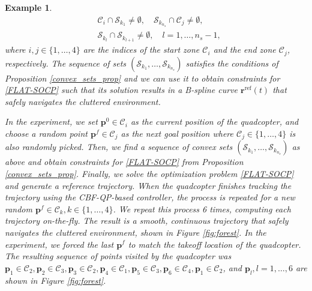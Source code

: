 \documentclass[journal,10pt]{IEEEtran}
\newtheorem{example}{\bfseries Example}%
\newcommand{\vect}[1]{\boldsymbol{\mathbf{#1}}}
\begin{document}
\begin{example}
\begin{align*}
    &\mathcal{C}_i \cap \mathcal{S}_{k_1} \neq \emptyset, \quad \mathcal{S}_{k_{n_s}}\cap\mathcal{C}_j\neq \emptyset,\\
    &\mathcal{S}_{k_l}\cap \mathcal{S}_{k_{l+1}}\neq \emptyset , \quad l = 1,\ldots,n_s-1,
\end{align*}
where $i,j\in\{1,\ldots,4\}$ are the indices of the start zone $\mathcal{C}_i$ and the end zone $\mathcal{C}_j$, respectively. The sequence of sets $(\mathcal{S}_{k_1},\ldots,\mathcal{S}_{k_{n_s}})$ satisfies the conditions of Proposition \ref{convex_sets_prop} and we can use it to obtain constraints for \eqref{FLAT-SOCP} such that its solution results in a B-spline curve $\vect{r}^{\text{ref}}(t)$ that safely navigates the cluttered environment.


In the experiment, we set $\vect{p}^{0}\in\mathcal{C}_i$ as the current position of the quadcopter, and choose a random point $\vect{p}^{f}\in\mathcal{C}_j$ as the next goal position where $\mathcal{C}_j\in\{1,\ldots,4\}$ is also randomly picked. Then, we find a sequence of convex sets $(\mathcal{S}_{k_1},\ldots,\mathcal{S}_{k_{n_s}})$ as above and obtain constraints for \eqref{FLAT-SOCP} from Proposition \ref{convex_sets_prop}. Finally, we solve the optimization problem \eqref{FLAT-SOCP} and generate a reference trajectory. When the quadcopter finishes tracking the trajectory using the CBF-QP-based controller, the process is repeated for a new random $\vect{p}^{f}\in\mathcal{C}_k,k\in\{1,\ldots,4\}$. We repeat this process 6 times, computing each trajectory on-the-fly. The result is a smooth, continuous trajectory that safely navigates the cluttered environment, shown in Figure \ref{fig:forest}. In the experiment, we forced the last $\vect{p}^f$ to match the takeoff location of the quadcopter. The resulting sequence of points visited by the quadcopter was $\vect{p}_1\in\mathcal{C}_2, \vect{p}_2\in\mathcal{C}_3, \vect{p}_3\in\mathcal{C}_2,\vect{p}_4\in\mathcal{C}_1, \vect{p}_5\in\mathcal{C}_3, \vect{p}_6\in\mathcal{C}_4, \vect{p}_1\in\mathcal{C}_2$, and  $\vect{p}_l,l=1,\ldots,6$ are shown in Figure \ref{fig:forest}. 



\end{example}
\end{document}
